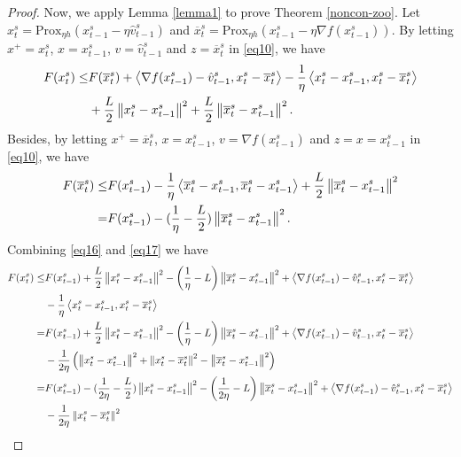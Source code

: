 \documentclass{article}
\newcommand*{\Po}{\text{Prox}}
\newcommand{\norm}[1]{\left\lVert#1\right\rVert}
\newcommand{\Iprod}[2]{\left\langle #1,#2\right\rangle}
\theoremstyle{definition}
\theoremstyle{remark}
\begin{document}
\begin{proof}
Now, we apply Lemma \ref{lemma1} to prove Theorem \ref{noncon-zoo}. Let $x_t^s = \Po_{\eta h} (x_{t-1}^s - \eta \hat{v}_{t-1}^s)$ and $\overline{x}_t^s = \Po_{\eta h} (x_{t-1}^s - \eta \nabla f(x_{t-1}^s))$. By letting $x^+ = x_t^s$, $x = x_{t-1}^s$, $v = \hat{v}_{t-1}^s$ and $z = \overline{x}_t^s$ in \eqref{eq10}, we have
\begin{align}
F(x^s_t) \leq& F(\overline{x}_t^s) + \Iprod{\nabla f(x_{t-1}^s)-\hat{v}_{t-1}^s}{x_t^s-\overline{x}_t^s}-\frac{1}{\eta} \Iprod{x_t^s-x_{t-1}^s}{x_t^s-\overline{x}_t^s}\notag\\
&+\frac{L}{2}\norm{x_t^s-x_{t-1}^s}^2+\frac{L}{2}\norm{\overline{x}_t^s-x_{t-1}^s}^2.\label{eq16}
\end{align}
Besides, by letting $x^+ = \overline{x}_t^s$, $x = x_{t-1}^s$, $v = \nabla f(x_{t-1}^s)$ and $z = x = {x}_{t-1}^s$ in \eqref{eq10}, we have
\begin{align}
F(\overline{x}_t^s) \leq& F({x}_{t-1}^s) - \frac{1}{\eta}\Iprod{\overline{x}_t^s-x_{t-1}^s}{\overline{x}_t^s - x_{t-1}^s}+\frac{L}{2}\norm{\overline{x}_t^s-x_{t-1}^s}^2\notag\\
 =& F({x}_{t-1}^s) -(\frac{1}{\eta}-\frac{L}{2})\norm{\overline{x}_t^s-x_{t-1}^s}^2.\label{eq17} 
\end{align}
Combining \eqref{eq16} and \eqref{eq17} we have 
 \begin{align}
 F({x}_t^s) \leq& F({x}_{t-1}^s) +\frac{L}{2}\norm{{x}_t^s-x_{t-1}^s}^2 - \left(\frac{1}{\eta}-L\right)\norm{\overline{x}_t^s-x_{t-1}^s}^2+\Iprod{\nabla f(x_{t-1}^s)-\hat{v}_{t-1}^s}{x_t^s - \overline{x}_t^s}\notag\\
 & -\frac{1}{\eta} \Iprod{x_t^s-x_{t-1}^s}{x_t^s-\overline{x}_{t}^s}\notag\\
  =& F({x}_{t-1}^s)  +\frac{L}{2}\norm{{x}_t^s-x_{t-1}^s}^2- \left(\frac{1}{\eta}-L\right)\norm{\overline{x}_t^s-x_{t-1}^s}^2+\Iprod{\nabla f(x_{t-1}^s)-\hat{v}_{t-1}^s}{x_t^s - \overline{x}_t^s}\notag\\
 &-\frac{1}{2\eta} \left(\norm{x_t^s-x_{t-1}^s}^2+ \norm{x_t^s-\overline{x}_{t}^s}^2-\norm{\overline{x}_{t}^s-x_{t-1}^s}^2\right)\notag\\
   =& F({x}_{t-1}^s)  -(\frac{1}{2\eta} - \frac{L}{2})\norm{{x}_t^s-x_{t-1}^s}^2- \left(\frac{1}{2\eta}-L\right)\norm{\overline{x}_t^s-x_{t-1}^s}^2+\Iprod{\nabla f(x_{t-1}^s)-\hat{v}_{t-1}^s}{x_t^s - \overline{x}_t^s}\notag\\
 & -\frac{1}{2\eta} \norm{x_t^s-\overline{x}_{t}^s}^2\notag\\

\end{align}
\end{proof}
\end{document}
